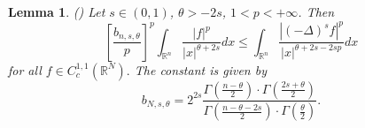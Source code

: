 \documentclass[11pt, twoside, notitlepage]{amsart}
\newtheorem{lemma}[theorem]{Lemma}
\newcommand\R{\mathbb{R}}
\numberwithin{equation}{section}
\begin{document}
\begin{lemma}\label{Lemma:deNitti}(\cite[Remark 2.5, item 2]{DeNitti-FracIneq-2024})
Let $s\in (0,1)$,   $\theta>-2s$, $1<p<+\infty$. Then
 \begin{equation*}%
   \left[   \frac{b_{n,s,\theta}}{p}\right]^p \int_{\R^n} \frac{|f|^p}{|x|^{\theta+2s}} dx \le \int_{\R^n}\frac{| (-\Delta)^s f |^p}{|x|^{\theta+2s-2sp}} dx
 \end{equation*}
  for all $f \in C^{1,1}_c(\R^N).$  The constant is given by
\begin{equation*}%
  b_{N,s,\theta}=2^{2s}
  \frac{
  \Gamma\left(  \frac{n-\theta}{2} \right) \cdot  \Gamma\left( \frac{2s+\theta}{2}\right)
  }
  {
   \Gamma \left(\frac{n-\theta-2s}{2} \right) \cdot  \Gamma\left(  \frac{\theta}{2}\right)
   }.
\end{equation*}
\end{lemma}




\end{document}
